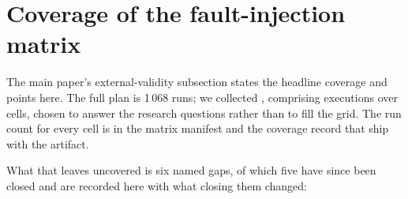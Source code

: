 \documentclass[10pt,journal,compsoc]{IEEEtran}
\begin{document}
\section{Coverage of the fault-injection matrix}
\label{supp:coverage}

The main paper's external-validity subsection states the headline coverage and
points here. The full plan is 1\,068 runs; we collected \RunsCollected{},
comprising \ExecutionsCollected{} executions over \CellsCollected{} cells,
chosen to answer the research questions rather than to fill the grid. The run
count for every cell is in the matrix manifest and the coverage record that
ship with the artifact.

What that leaves uncovered is six named gaps, of which five have
since been closed and are recorded here with what closing them changed:
\end{document}
